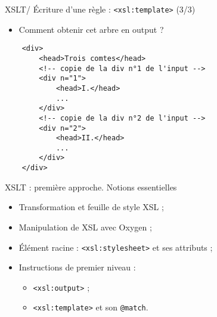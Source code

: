\documentclass{beamer}
\begin{document}
    \begin{frame}[fragile]{XSLT/ Écriture d'une règle : \texttt{<xsl:template>} (3/3)}
    \Large
        \begin{itemize}
            \item Comment obtenir cet arbre en output ?
        \end{itemize}
        \normalsize
        \begin{verbatim}
    <div>
        <head>Trois comtes</head>
        <!-- copie de la div n°1 de l'input -->
        <div n="1">
            <head>I.</head>
            ...
        </div>
        <!-- copie de la div n°2 de l'input -->
        <div n="2">
            <head>II.</head>
            ...
        </div>
    </div>
        \end{verbatim}
        
    \end{frame}

    \begin{frame}{XSLT : première approche. Notions essentielles}
        \Large
        \begin{itemize}
            \item Transformation et feuille de style XSL ;
            \bigskip
            \item Manipulation de XSL avec Oxygen ;
            \bigskip
            \item Élément racine : \texttt{<xsl:stylesheet>} et ses attributs ;
            \bigskip
            \item Instructions de premier niveau :
            \begin{itemize}
            \Large
                \item \texttt{<xsl:output>} ;
                \item \texttt{<xsl:template>} et son \texttt{@match}.
            \end{itemize}
        \end{itemize}
    \end{frame}
\end{document}
